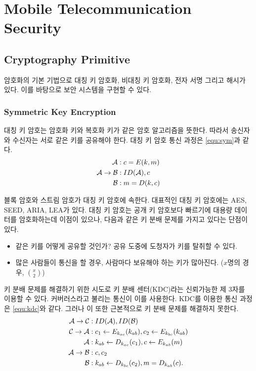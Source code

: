 \chapter{Mobile Telecommunication Security}

\newpage
\section{Cryptography Primitive}

암호화의 기본 기법으로 대칭 키 암호화, 비대칭 키 암호화, 전자 서명 그리고 해시가 있다.
이를 바탕으로 보안 시스템을 구현할 수 있다.

\subsection*{Symmetric Key Encryption}

대칭 키 암호는 암호화 키와 복호화 키가 같은 암호 알고리즘을 뜻한다. 따라서
송신자와 수신자는 서로 같은 키를 공유해야 한다. 대칭 키 암호 통신 과정은
\ref{equ:sym}과 같다.
\begin{equation}
  \begin{split}
    \mathcal{A}&: c = E(k, m) \\
    \mathcal{A} \to \mathcal{B}&: ID(\mathcal{A}), c \\
    \mathcal{B}&: m = D(k, c)
  \end{split}
  \label{equ:sym}
\end{equation}

블록 암호와 스트림 암호가 대칭 키 암호에 속한다. 대표적인 대칭 키 암호에는 AES,
SEED, ARIA, LEA가 있다. 대칭 키 암호는 공개 키 암호보다 빠르기에 대용량 데이터를
암호화하는데 이점이 있으나, 다음과 같은 키 분배 문제를 가지고 있다는 단점이
있다.
\begin{itemize}
  \item 같은 키를 어떻게 공유할 것인가? 공유 도중에 도청자가 키를 탈취할 수
        있다.
  \item 많은 사람들이 통신을 할 경우, 사람마다 보유해야 하는 키가 많아진다.
        ($x$명의 경우, $\binom{x}{2}$)
\end{itemize}

키 분배 문제를 해결하기 위한 시도로 키 분배 센터(KDC)라는 신뢰가능한 제 3자를
이용할 수 있다. 커버러스라고 불리는 통신이 이를 사용한다. KDC를 이용한 통신
과정은 \ref{equ:kdc}와 같다. 그러나 이 또한 근본적으로 키 분배 문제를 해결하지
못한다.
\begin{equation}
  \begin{split}
    \mathcal{A} \to \mathcal{C}&: ID(\mathcal{A}), ID(\mathcal{B}) \\
    \mathcal{C} \to \mathcal{A}&: c_1 \leftarrow E_{k_{ac}}(k_{ab}),
    c_2 \leftarrow E_{k_{bc}}(k_{ab}) \\
    \mathcal{A}&: k_{ab} \leftarrow D_{k_{ac}}(c_1),
    c \leftarrow E_{k_{ab}}(m) \\
    \mathcal{A} \to \mathcal{B}&: c, c_2 \\
    \mathcal{B}&: k_{ab} \leftarrow D_{k_{bc}}(c_2),
    m = D_{k_{ab}}(c).
  \end{split}
  \label{equ:kdc}
\end{equation}

